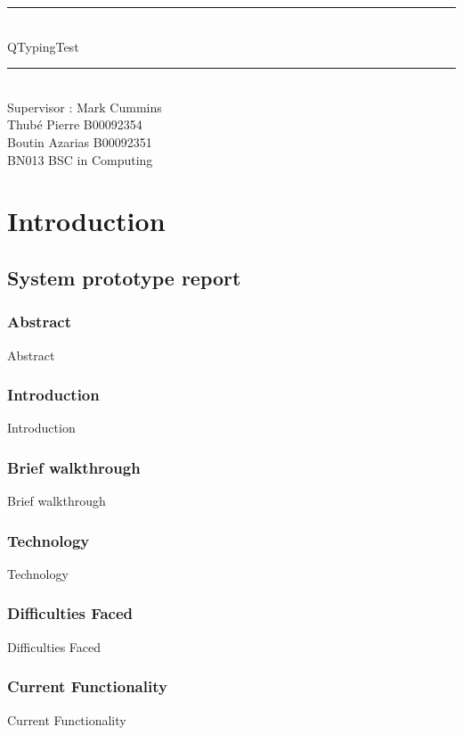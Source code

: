 \documentclass[12pt]{report}
\newcommand{\Mline}{\hrule \mbox{}\\[0.1cm]}
\begin{document}
\begin{titlepage}
\begin{center}


\Mline
{ \LARGE QTypingTest \\[0.4cm] }
\Mline

\textsf{Supervisor : Mark Cummins}\\[3cm]

\textsf{Thubé Pierre B00092354\\
	Boutin Azarias B00092351\\[2cm]
	BN013 BSC in Computing}

\end{center}
\end{titlepage}

\setcounter{page}{2}

\tableofcontents


\part{Introduction}

\chapter{System prototype report}

\section{Abstract}
Abstract

\section{Introduction}
Introduction

\section{Brief walkthrough}
Brief walkthrough

\section{Technology}
Technology

\section{Difficulties Faced}
Difficulties Faced

\section{Current Functionality}
Current Functionality
\end{document}

